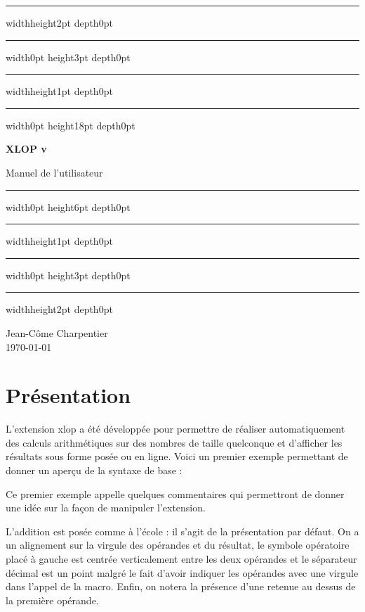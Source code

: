 \documentclass[12pt]{report}
\newcommand\package[1]{\textsf{#1}}
\begin{document}
\begin{titlepage}
  \null\par\vfill
  \begin{center}
    \begin{minipage}{0.75\linewidth}
      \hrule width\linewidth height2pt depth0pt
      \hrule width0pt height3pt depth0pt
      \hrule width\linewidth height1pt depth0pt
      \hrule width0pt height18pt depth0pt
      \begin{center}
        \Huge\bfseries XLOP v \fileversion\par\vskip18pt
        Manuel de l'utilisateur
      \end{center}
      \hrule width0pt height6pt depth0pt
      \hrule width\linewidth height1pt depth0pt
      \hrule width0pt height3pt depth0pt
      \hrule width\linewidth height2pt depth0pt
    \end{minipage}
  \end{center}
  \vfill
  \begin{center}
    Jean-Côme Charpentier\\
    \today
  \end{center}
  \vfill\null\par
\end{titlepage}
\newpage
{}
\tableofcontents
\newpage
{}

\chapter{Présentation}
\label{chap:Présentation}
L'extension \package{xlop} a été développée pour permettre de réaliser
automatiquement des calculs arithmétiques sur des nombres de taille
quelconque et d'afficher les résultats sous forme posée ou en
ligne. Voici un premier exemple permettant de donner un aperçu de la
syntaxe de base :
\begin{SideBySideExample}
\end{SideBySideExample}
Ce premier exemple appelle quelques commentaires qui permettront de
donner une idée sur la façon de manipuler l'extension.

L'addition est posée \og comme à l'école \fg{} : il s'agit de la
présentation par défaut. On a un alignement sur la virgule des
opérandes et du résultat, le symbole opératoire placé à gauche est
centrée verticalement entre les deux opérandes et le séparateur
décimal est un point malgré le fait d'avoir indiquer les opérandes
avec une virgule dans l'appel de la macro. Enfin, on notera la
présence d'une retenue au dessus de la première opérande.
\end{document}
